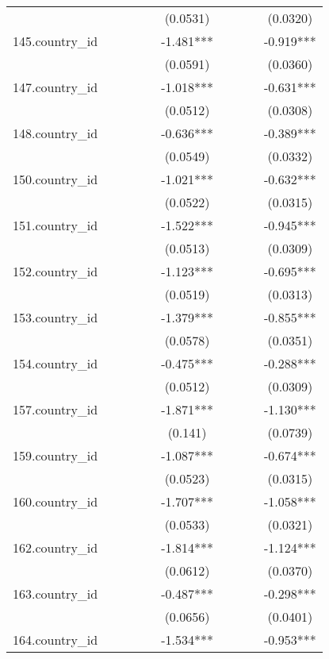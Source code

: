 \documentclass[]{article}
\begin{document}
\begin{tabular}{lccccccccc}
 &  &  &  &  & (0.0531) &  &  &  & (0.0320) \\
145.country\_id &  &  &  &  & -1.481*** &  &  &  & -0.919*** \\
 &  &  &  &  & (0.0591) &  &  &  & (0.0360) \\
147.country\_id &  &  &  &  & -1.018*** &  &  &  & -0.631*** \\
 &  &  &  &  & (0.0512) &  &  &  & (0.0308) \\
148.country\_id &  &  &  &  & -0.636*** &  &  &  & -0.389*** \\
 &  &  &  &  & (0.0549) &  &  &  & (0.0332) \\
150.country\_id &  &  &  &  & -1.021*** &  &  &  & -0.632*** \\
 &  &  &  &  & (0.0522) &  &  &  & (0.0315) \\
151.country\_id &  &  &  &  & -1.522*** &  &  &  & -0.945*** \\
 &  &  &  &  & (0.0513) &  &  &  & (0.0309) \\
152.country\_id &  &  &  &  & -1.123*** &  &  &  & -0.695*** \\
 &  &  &  &  & (0.0519) &  &  &  & (0.0313) \\
153.country\_id &  &  &  &  & -1.379*** &  &  &  & -0.855*** \\
 &  &  &  &  & (0.0578) &  &  &  & (0.0351) \\
154.country\_id &  &  &  &  & -0.475*** &  &  &  & -0.288*** \\
 &  &  &  &  & (0.0512) &  &  &  & (0.0309) \\
157.country\_id &  &  &  &  & -1.871*** &  &  &  & -1.130*** \\
 &  &  &  &  & (0.141) &  &  &  & (0.0739) \\
159.country\_id &  &  &  &  & -1.087*** &  &  &  & -0.674*** \\
 &  &  &  &  & (0.0523) &  &  &  & (0.0315) \\
160.country\_id &  &  &  &  & -1.707*** &  &  &  & -1.058*** \\
 &  &  &  &  & (0.0533) &  &  &  & (0.0321) \\
162.country\_id &  &  &  &  & -1.814*** &  &  &  & -1.124*** \\
 &  &  &  &  & (0.0612) &  &  &  & (0.0370) \\
163.country\_id &  &  &  &  & -0.487*** &  &  &  & -0.298*** \\
 &  &  &  &  & (0.0656) &  &  &  & (0.0401) \\
164.country\_id &  &  &  &  & -1.534*** &  &  &  & -0.953*** \\

\end{tabular}
\end{document}
